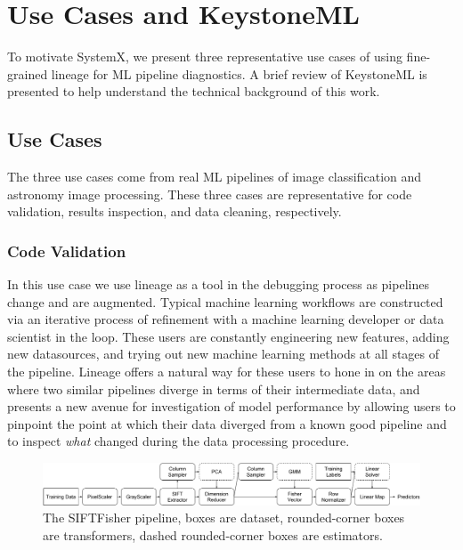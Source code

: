 \documentclass{sig-alternate}
\begin{document}
\section{Use Cases and K\MakeLowercase{eystone}ML}
\label{sec:Background}
To motivate SystemX, we present three representative use cases of using fine-grained lineage for ML pipeline diagnostics.
A brief review of KeystoneML is presented to help understand the technical background of this work.

\subsection{Use Cases}
\label{sec:Back-cases}
The three use cases come from real ML pipelines of image classification and astronomy image processing. 
These three cases are representative for code validation, results inspection, and data cleaning, respectively.

\subsubsection{Code Validation}
In this use case we use lineage as a tool in the debugging process as pipelines change and are augmented. 
Typical machine learning workflows are constructed via an iterative process of refinement with a machine learning developer or data scientist in the loop.
These users are constantly engineering new features, adding new datasources, and trying out new machine learning methods at all stages of the pipeline.
Lineage offers a natural way for these users to hone in on the areas where two similar pipelines diverge in terms of their intermediate data, and presents a new avenue for investigation of model performance by allowing users to pinpoint the point at which their data diverged from a known good pipeline and to inspect \emph{what} changed during the data processing procedure. 


\begin{figure}[t]
\begin{center}
    \includegraphics[width=150mm]{pictures/VOCSIFTFisher}
    \caption {The SIFTFisher pipeline, boxes are dataset, rounded-corner boxes are transformers, dashed rounded-corner boxes are estimators.
    \label{fig:vocsiftfisher}
}
\end{center}
\end{figure}
\end{document}
